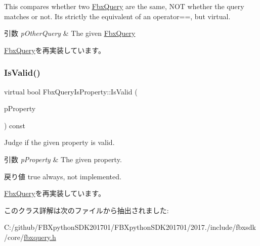 This compares whether two \hyperlink{class_fbx_query}{Fbx\+Query} are the same, N\+OT whether the query matches or not. It\textquotesingle{}s strictly the equivalent of an operator==, but virtual. 
\begin{DoxyParams}{引数}
{\em p\+Other\+Query} & The given \hyperlink{class_fbx_query}{Fbx\+Query} \\
\hline
\end{DoxyParams}


\hyperlink{class_fbx_query_adfc24c7306ceed2fcfd8c67198e0c1dd}{Fbx\+Query}を再実装しています。

\mbox{\label{class_fbx_query_is_property_a6f9680d513428cba6321203c9b3da71e}} 
\subsubsection{\texorpdfstring{Is\+Valid()}{IsValid()}}
{\footnotesize\ttfamily virtual bool Fbx\+Query\+Is\+Property\+::\+Is\+Valid (\begin{DoxyParamCaption}\item[{const \hyperlink{class_fbx_property}{Fbx\+Property} \&}]{p\+Property }\end{DoxyParamCaption}) const\hspace{0.3cm}{\ttfamily [virtual]}}

Judge if the given property is valid. 
\begin{DoxyParams}{引数}
{\em p\+Property} & The given property. \\
\hline
\end{DoxyParams}
\begin{DoxyReturn}{戻り値}
{\ttfamily true} always, not implemented. 
\end{DoxyReturn}


\hyperlink{class_fbx_query_a822776baf45a56d8e126e948ec25d920}{Fbx\+Query}を再実装しています。



このクラス詳解は次のファイルから抽出されました\+:\begin{DoxyCompactItemize}
\item 
C\+:/github/\+F\+B\+Xpython\+S\+D\+K201701/\+F\+B\+Xpython\+S\+D\+K201701/2017./include/fbxsdk/core/\hyperlink{fbxquery_8h}{fbxquery.\+h}\end{DoxyCompactItemize}
